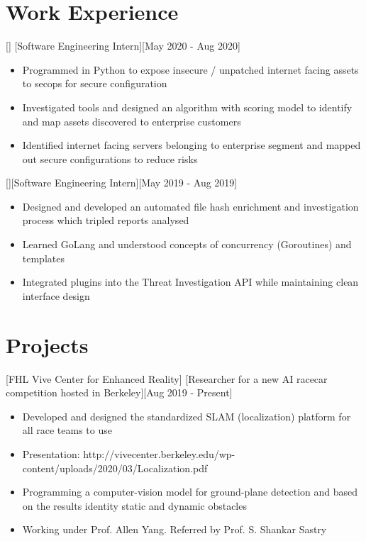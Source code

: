 \documentclass{article}
\begin{document}
\section{Work Experience}

[]
[Software Engineering Intern][May 2020 - Aug 2020]

\begin{itemize}
\item Programmed in Python to expose insecure / unpatched internet facing assets to secops for secure configuration
\item Investigated tools and designed an algorithm with scoring model to identify and map assets discovered to enterprise customers
\item Identified internet facing servers belonging to enterprise segment and mapped out secure configurations to reduce risks
\end{itemize}

[][Software Engineering Intern][May 2019 - Aug 2019]

\begin{itemize}
\item Designed and developed an automated file hash enrichment and investigation process which tripled reports analysed
\item Learned GoLang and understood concepts of concurrency (Goroutines) and templates 
\item Integrated plugins into the Threat Investigation API while maintaining clean interface design
\end{itemize}
 
\section{Projects}
 [FHL Vive Center
for Enhanced Reality]
[Researcher for a new AI racecar competition hosted in Berkeley][Aug 2019 - Present]
\begin{itemize}
\item Developed and designed the standardized SLAM (localization) platform for all race teams to use 
\item Presentation: http://vivecenter.berkeley.edu/wp-content/uploads/2020/03/Localization.pdf
\item Programming a computer-vision model for ground-plane detection and based on the results identity static and dynamic obstacles 
\item Working under Prof. Allen Yang. Referred by Prof. S. Shankar Sastry
\end{itemize}
\end{document}
